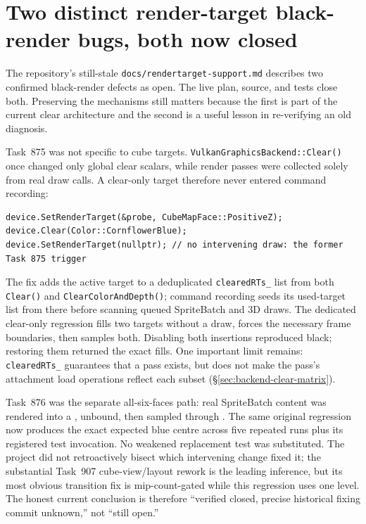 \section{Two distinct render-target black-render bugs, both now closed}
\label{sec:vulkan-rendertarget-black}

The repository's still-stale \texttt{docs/rendertarget-support.md} describes two confirmed
black-render defects as open. The live plan, source, and tests close both. Preserving the
mechanisms still matters because the first is part of the current clear architecture and the
second is a useful lesson in re-verifying an old diagnosis.

Task~875 was not specific to cube targets. \texttt{VulkanGraphicsBackend::Clear()} once changed
only global clear scalars, while render passes were collected solely from real draw calls. A
clear-only target therefore never entered command recording:

\begin{lstlisting}
device.SetRenderTarget(&probe, CubeMapFace::PositiveZ);
device.Clear(Color::CornflowerBlue);
device.SetRenderTarget(nullptr); // no intervening draw: the former Task 875 trigger
\end{lstlisting}

The fix adds the active target to a deduplicated \texttt{clearedRTs\_} list from both
\texttt{Clear()} and \texttt{ClearColorAndDepth()}; command recording seeds its used-target
list from there before scanning queued SpriteBatch and 3D draws. The dedicated clear-only
 regression fills two targets without a draw, forces the necessary
frame boundaries, then samples both. Disabling both insertions
reproduced black; restoring them returned the exact fills. One important limit remains:
\texttt{clearedRTs\_} guarantees that a pass exists, but does not make the pass's attachment
load operations reflect each  subset
(\S\ref{sec:backend-clear-matrix}).

Task~876 was the separate all-six-faces path: real SpriteBatch content was rendered into a
, unbound, then sampled through .
The same original regression now produces the exact expected blue centre across five repeated
runs plus its registered test invocation. No weakened replacement test was substituted.
The project did not retroactively bisect which intervening change fixed it; the substantial
Task~907 cube-view/layout rework is the leading inference, but its most obvious transition fix
is mip-count-gated while this regression uses one level. The honest current conclusion is
therefore ``verified closed, precise historical fixing commit unknown,'' not ``still open.''

